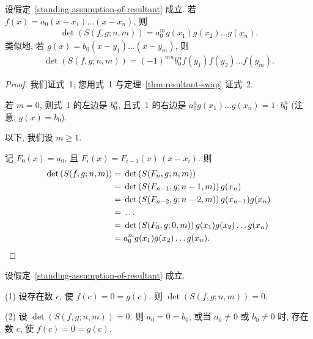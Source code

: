 \documentclass[../libro.tex]{subfiles}
\begin{document}
\begin{theorem}
    设假定~\ref{standing-assumption-of-resultant} 成立.
    若 \(f(x) = a_0 (x - x_1) \dots (x - x_n)\), 则
    \begin{align*}
        \det {(S(f, g; n, m))} = a_0^m g(x_1) g(x_2) \dots g(x_n).
    \end{align*}
    类似地,
    若 \(g(x) = b_0 (x - y_1) \dots (x - y_m)\), 则
    \begin{align*}
        \det {(S(f, g; n, m))} = (-1)^{mn} b_0^n f(y_1) f(y_2) \dots f(y_m).
    \end{align*}
\end{theorem}

\begin{proof}
    我们证式~1;
    您用式~1 与定理~\ref{thm:resultant-swap} 证式~2.

    若 \(m = 0\),
    则式~1 的左边是 \(b_0^n\),
    且式~1 的右边是
    \(a_0^0 g(x_1) \dots g(x_n) = 1 \cdot b_0^n\)
    (注意, \(g(x) = b_0\)).

    以下, 我们设 \(m \geq 1\).

    记 \(F_0 (x) = a_0\),
    且 \(F_i (x) = F_{i-1} (x)\, (x - x_i)\).
    则
    \begin{align*}
        \det {(S(f, g; n, m))}
        = {} &
        \det {(S(F_n, g; n, m))}
        \\
        = {} &
        \det {(S(F_{n-1}, g; n-1, m))}\,
        g(x_n)
        \\
        = {} &
        \det {(S(F_{n-2}, g; n-2, m))}\,
        g(x_{n-1}) g(x_n)
        \\
        = {} &
        \dots
        \\
        = {} &
        \det {(S(F_0, g; 0, m))}\,
        g(x_1) g(x_2) \dots g(x_n)
        \\
        = {} &
        a_0^m g(x_1) g(x_2) \dots g(x_n).
        \qedhere
    \end{align*}
\end{proof}

\begin{theorem}
    设假定~\ref{standing-assumption-of-resultant} 成立.

    (1)
    设存在数 \(c\), 使 \(f(c) = 0 = g(c)\).
    则 \(\det {(S(f, g; n, m))} = 0\).

    (2)
    设 \(\det {(S(f, g; n, m))} = 0\).
    则 \(a_0 = 0 = b_0\),
    或当 \(a_0 \neq 0\) 或 \(b_0 \neq 0\) 时,
    存在数 \(c\), 使 \(f(c) = 0 = g(c)\).
\end{theorem}
\end{document}
